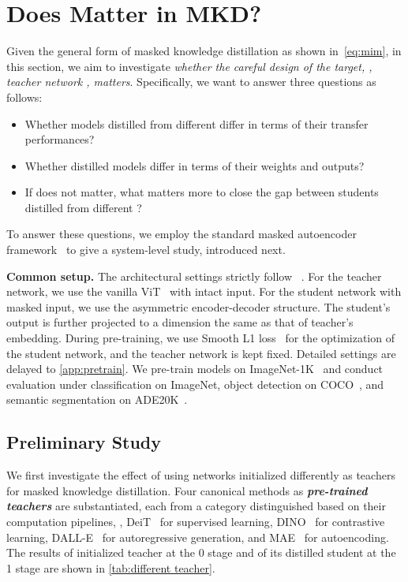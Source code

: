 \documentclass[10pt,twocolumn,letterpaper]{article}
\renewcommand{\paragraph}[1]{\vspace{1.25mm}\noindent\textbf{#1}}
\begin{document}
\section{Does  Matter in MKD?}
\label{sec:study}

Given the general form of masked knowledge distillation as shown in~\cref{eq:mim}, in this section, we aim to investigate \textit{whether the careful design of the target, \ie, teacher network , matters}.  Specifically, we want to answer three questions as follows: 
\begin{itemize}
    \item Whether models distilled from different  differ in terms of their transfer performances?
    \item Whether distilled models differ in terms of their weights and outputs?
    \item If  does not matter, what matters more to close the gap between students distilled from different ?
\end{itemize}
To answer these questions, we employ the standard masked autoencoder framework~\cite{mae} to give a system-level study, introduced next.

\paragraph{Common setup.}
\label{study:setup}
The architectural settings strictly follow ~\cite{mae}.
For the teacher network, we use the vanilla ViT~\cite{vit} with intact input.
For the student network with masked input, we use the asymmetric encoder-decoder structure.
The student's output is further projected to a dimension the same as that of teacher's embedding. 
During pre-training, we use Smooth L1 loss~\cite{fast-rcnn} for the optimization of the student network, and the teacher network is kept fixed. Detailed settings are delayed to \cref{app:pretrain}.
We pre-train models on ImageNet-1K~\cite{imagenet} and conduct evaluation under classification on ImageNet, object detection on COCO~\cite{coco}, and semantic segmentation on ADE20K~\cite{ade}.




\subsection{Preliminary Study}
We first investigate the effect of using networks initialized differently as teachers for masked knowledge distillation.
Four canonical methods as \textbf{\textit{pre-trained teachers}} are substantiated, each from a category distinguished based on their computation pipelines, \ie, DeiT~\cite{deit} for supervised learning, DINO~\cite{dino} for contrastive learning, DALL-E~\cite{dall-e} for autoregressive generation, and MAE~\cite{mae} for autoencoding.
The results of initialized teacher at the 0 stage and of its distilled student at the 1 stage are shown in \cref{tab:different teacher}.
\end{document}
